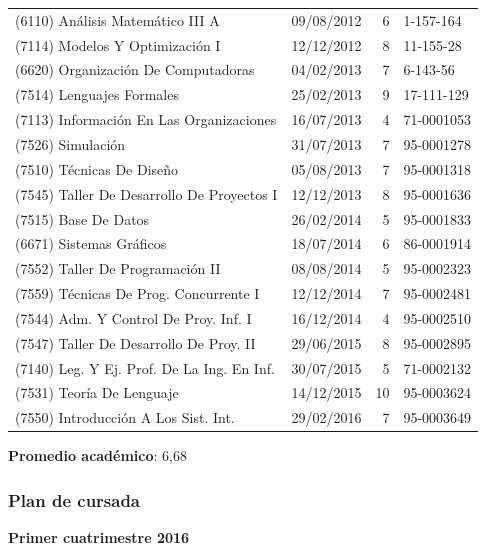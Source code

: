 \documentclass[a4paper,11pt]{article}
\begin{document}
\begin{longtable}{|l|l|r|l|}
  (6110) Análisis Matemático III A           & 09/08/2012 & 6  & 1-157-164         \\
  (7114) Modelos Y Optimización I            & 12/12/2012 & 8  & 11-155-28         \\
  (6620) Organización De Computadoras        & 04/02/2013 & 7  & 6-143-56          \\
  (7514) Lenguajes Formales                  & 25/02/2013 & 9  & 17-111-129        \\
  (7113) Información En Las Organizaciones   & 16/07/2013 & 4  & 71-0001053        \\
  (7526) Simulación                          & 31/07/2013 & 7  & 95-0001278        \\
  (7510) Técnicas De Diseño                  & 05/08/2013 & 7  & 95-0001318        \\
  (7545) Taller De Desarrollo De Proyectos I & 12/12/2013 & 8  & 95-0001636        \\
  (7515) Base De Datos                       & 26/02/2014 & 5  & 95-0001833        \\
  (6671) Sistemas Gráficos                   & 18/07/2014 & 6  & 86-0001914        \\
  (7552) Taller De Programación II           & 08/08/2014 & 5  & 95-0002323        \\
  (7559) Técnicas De Prog. Concurrente I     & 12/12/2014 & 7  & 95-0002481        \\
  (7544) Adm. Y Control De Proy. Inf. I      & 16/12/2014 & 4  & 95-0002510        \\
  (7547) Taller De Desarrollo De Proy. II    & 29/06/2015 & 8  & 95-0002895        \\
  (7140) Leg. Y Ej. Prof. De La Ing. En Inf. & 30/07/2015 & 5  & 71-0002132        \\
  (7531) Teoría De Lenguaje                  & 14/12/2015 & 10 & 95-0003624        \\
  (7550) Introducción A Los Sist. Int.       & 29/02/2016 & 7  & 95-0003649        \\
  \hline
\end{longtable}

\textbf{Promedio académico}: 6,68

\subsubsection{Plan de cursada}

\textbf{Primer cuatrimestre 2016}
\end{document}
